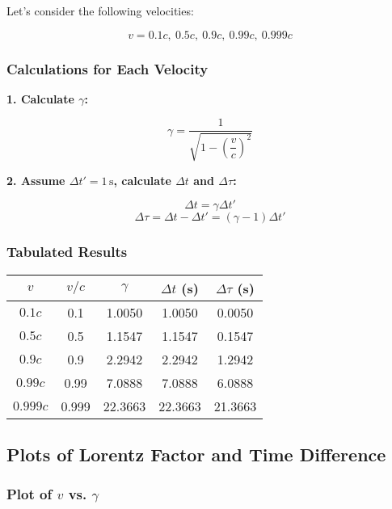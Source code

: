\documentclass{article}
\begin{document}
\begin{multicols}{2}
Let’s consider the following velocities:

\[
v = 0.1c,\ 0.5c,\ 0.9c,\ 0.99c,\ 0.999c
\]

\subsubsection*{Calculations for Each Velocity}

\textbf{1. Calculate \( \gamma \):}

\[
\gamma = \frac{1}{\sqrt{1 - \left( \dfrac{v}{c} \right)^2 }}
\]

\textbf{2. Assume \( \Delta t' = 1\, \text{s} \), calculate \( \Delta t \) and \( \Delta \tau \):}

\[
\Delta t = \gamma \Delta t'
\]
\[
\Delta \tau = \Delta t - \Delta t' = (\gamma - 1) \Delta t'
\]

\subsubsection*{Tabulated Results}

\begin{center}
\begin{tabular}{@{}ccccc@{}}
\toprule
\( v \) & \( v/c \) & \( \gamma \) & \( \Delta t \) (s) & \( \Delta \tau \) (s) \\
\midrule
\( 0.1c \) & 0.1 & 1.0050 & 1.0050 & 0.0050 \\
\( 0.5c \) & 0.5 & 1.1547 & 1.1547 & 0.1547 \\
\( 0.9c \) & 0.9 & 2.2942 & 2.2942 & 1.2942 \\
\( 0.99c \) & 0.99 & 7.0888 & 7.0888 & 6.0888 \\
\( 0.999c \) & 0.999 & 22.3663 & 22.3663 & 21.3663 \\
\bottomrule
\end{tabular}
\end{center}

\subsection*{Plots of Lorentz Factor and Time Difference}

\subsubsection*{Plot of \( v \) vs. \( \gamma \)}



\end{multicols}
\end{document}
